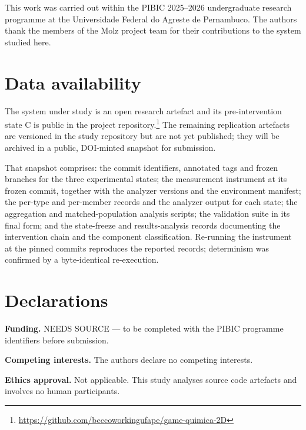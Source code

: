 \documentclass{sbc2019}%
\begin{document}
\FloatBarrier

\begin{acknowledgements}
This work was carried out within the PIBIC 2025--2026 undergraduate research
programme at the Universidade Federal do Agreste de Pernambuco. The authors
thank the members of the Molz project team for their contributions to the
system studied here.
\end{acknowledgements}

\section*{Data availability}

The system under study is an open research artefact and its pre-intervention
state C is public in the project
repository.\footnote{\url{https://github.com/bcccoworkingufape/game-quimica-2D}}
The remaining replication artefacts are versioned in the study repository but
are not yet published; they will be archived in a public, DOI-minted snapshot
for submission.

That snapshot comprises: the commit identifiers, annotated tags and frozen
branches for the three experimental states; the measurement instrument at its frozen commit,
together with the analyzer versions and the environment manifest; the per-type
and per-member records and the analyzer output for each state; the aggregation
and matched-population analysis scripts; the validation suite in its final form;
and the state-freeze and results-analysis records documenting the intervention
chain and the component classification. Re-running the instrument at the pinned
commits reproduces the reported records; determinism was confirmed by a
byte-identical re-execution.

\section*{Declarations}

\noindent\textbf{Funding.} NEEDS SOURCE --- to be completed with the PIBIC
programme identifiers before submission.

\noindent\textbf{Competing interests.} The authors declare no competing
interests.

\noindent\textbf{Ethics approval.} Not applicable. This study analyses source
code artefacts and involves no human participants.



\end{document}
